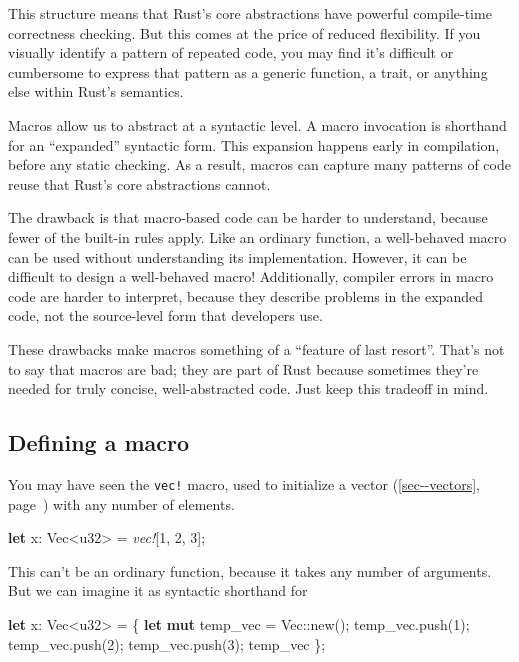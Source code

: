 \documentclass[a4paper,]{book}
\renewcommand*{\hyperlink}[2]{%
 #2 (\autoref{#1}, page~\pageref{#1})}
\newenvironment{Shaded}{\begin{snugshade}}{\end{snugshade}}
\newcommand{\KeywordTok}[1]{\textcolor[rgb]{0.13,0.29,0.53}{\textbf{{#1}}}}
\newcommand{\DataTypeTok}[1]{\textcolor[rgb]{0.13,0.29,0.53}{{#1}}}
\newcommand{\DecValTok}[1]{\textcolor[rgb]{0.00,0.00,0.81}{{#1}}}
\newcommand{\PreprocessorTok}[1]{\textcolor[rgb]{0.56,0.35,0.01}{\textit{{#1}}}}
\newcommand{\NormalTok}[1]{{#1}}
\begin{document}
This structure means that Rust's core abstractions have powerful
compile-time correctness checking. But this comes at the price of
reduced flexibility. If you visually identify a pattern of repeated
code, you may find it's difficult or cumbersome to express that pattern
as a generic function, a trait, or anything else within Rust's
semantics.

Macros allow us to abstract at a syntactic level. A macro invocation is
shorthand for an ``expanded'' syntactic form. This expansion happens
early in compilation, before any static checking. As a result, macros
can capture many patterns of code reuse that Rust's core abstractions
cannot.

The drawback is that macro-based code can be harder to understand,
because fewer of the built-in rules apply. Like an ordinary function, a
well-behaved macro can be used without understanding its implementation.
However, it can be difficult to design a well-behaved macro!
Additionally, compiler errors in macro code are harder to interpret,
because they describe problems in the expanded code, not the
source-level form that developers use.

These drawbacks make macros something of a ``feature of last resort''.
That's not to say that macros are bad; they are part of Rust because
sometimes they're needed for truly concise, well-abstracted code. Just
keep this tradeoff in mind.

\subsection{Defining a macro}\label{defining-a-macro}

You may have seen the \texttt{vec!} macro, used to initialize a
\protect\hyperlink{sec--vectors}{vector} with any number of elements.

\begin{Shaded}
\begin{Highlighting}[]
\KeywordTok{let} \NormalTok{x: }\DataTypeTok{Vec}\NormalTok{<}\DataTypeTok{u32}\NormalTok{> = }\PreprocessorTok{vec!}\NormalTok{[}\DecValTok{1}\NormalTok{, }\DecValTok{2}\NormalTok{, }\DecValTok{3}\NormalTok{];}
\end{Highlighting}
\end{Shaded}

This can't be an ordinary function, because it takes any number of
arguments. But we can imagine it as syntactic shorthand for

\begin{Shaded}
\begin{Highlighting}[]
\KeywordTok{let} \NormalTok{x: }\DataTypeTok{Vec}\NormalTok{<}\DataTypeTok{u32}\NormalTok{> = \{}
    \KeywordTok{let} \KeywordTok{mut} \NormalTok{temp_vec = }\DataTypeTok{Vec}\NormalTok{::new();}
    \NormalTok{temp_vec.push(}\DecValTok{1}\NormalTok{);}
    \NormalTok{temp_vec.push(}\DecValTok{2}\NormalTok{);}
    \NormalTok{temp_vec.push(}\DecValTok{3}\NormalTok{);}
    \NormalTok{temp_vec}
\NormalTok{\};}
\end{Highlighting}
\end{Shaded}
\end{document}
